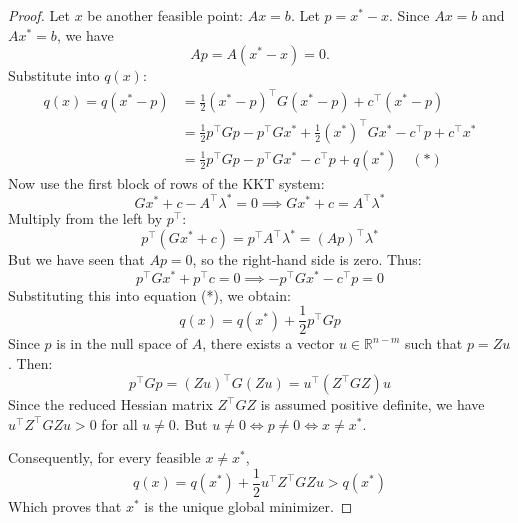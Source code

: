 \begin{proof}
    Let $x$ be another feasible point: $Ax = b$.
    Let $p = x^* - x$.
    Since $Ax = b$ and $Ax^* = b$, we have
    \begin{equation}
        Ap = A(x^* - x) = 0.
    \end{equation}
    Substitute into $q(x)$:
    \begin{align*}
        q(x) = q(x^* - p) &= \frac{1}{2} (x^* - p)^\top G (x^* - p) + c^\top (x^* - p) \\
                          &= \frac{1}{2} p^\top G p - p^\top G x^* + \frac{1}{2} (x^*)^\top G x^* - c^\top p + c^\top x^* \\
                          &= \frac{1}{2} p^\top G p - p^\top G x^* - c^\top p + q(x^*) \quad (*)
    \end{align*}
    Now use the first block of rows of the KKT system:
    \begin{equation}
        G x^* + c - A^\top \lambda^* = 0 \implies G x^* + c = A^\top \lambda^*
    \end{equation}
    Multiply from the left by $p^\top$:
    \begin{equation}
        p^\top (G x^* + c) = p^\top A^\top \lambda^* = (Ap)^\top \lambda^*
    \end{equation}
    But we have seen that $Ap = 0$, so the right-hand side is zero. Thus:
    \begin{equation}
        p^\top G x^* + p^\top c = 0 \implies -p^\top G x^* - c^\top p = 0
    \end{equation}
    Substituting this into equation (*), we obtain:
    \begin{equation}
        q(x) = q(x^*) + \frac{1}{2} p^\top G p
    \end{equation}
    Since $p$ is in the null space of $A$, there exists a vector $u \in \mathbb{R}^{n-m}$ such that $p = Zu$. Then:
    \begin{equation}
        p^\top G p = (Zu)^\top G (Zu) = u^\top (Z^\top G Z) u
    \end{equation}
    Since the reduced Hessian matrix $Z^\top G Z$ is assumed positive definite, we have $u^\top Z^\top G Z u > 0$ for all $u \neq 0$.
    But $u \neq 0 \iff p \neq 0 \iff x \neq x^*$.
    
    Consequently, for every feasible $x \neq x^*$,
    \begin{equation}
        q(x) = q(x^*) + \frac{1}{2} u^\top Z^\top G Z u > q(x^*)
    \end{equation}
    Which proves that $x^*$ is the unique global minimizer.
\end{proof}

